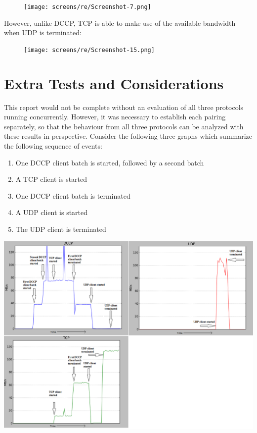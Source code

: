 \documentclass[10pt,a4paper]{article}
\begin{document}
\begin{figure}[!h]
\begin{center}
\hspace*{-65pt}
\texttt{[image: screens/re/Screenshot-7.png]}
\end{center}
\end{figure}
\clearpage
However, unlike DCCP, TCP is able to make use of the available
bandwidth when UDP is terminated:

\begin{figure}[!h]
\begin{center}
\hspace*{-65pt}
\texttt{[image: screens/re/Screenshot-15.png]}
\end{center}
\end{figure}


\section{Extra Tests and Considerations} %
This report would not be complete without an evaluation of all three protocols
running concurrently. However, it was necessary to establish each pairing
separately, so that  the behaviour from all
three protocols can be analyzed with these results in perspective. Consider the
following three graphs which summarize the following sequence of events:

\begin{enumerate}
 \item One DCCP client batch is started, followed by a second batch
 \item A TCP client is started
 \item One DCCP client batch is terminated
 \item A UDP client is started
 \item The UDP client is terminated
\end{enumerate}

\hspace*{-65pt}
\includegraphics[scale=.52]{screens/trio.png}
\end{document}
